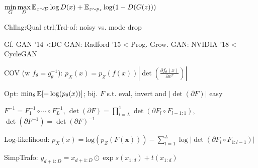 $\min\limits_G\max\limits_D \mathbb{E}_{x\sim\mathcal{D}}\log D(x)+\mathbb{E}_{z\sim p_z}\log(1-D(G(z)))$

Chllng:Qual ctrl;Trd-of: noisy vs. mode drop

Gf. GAN '14 <DC GAN: Radford '15 < Prog.-Grow. GAN: NVIDIA '18 < CycleGAN

COV (w $f_{\theta}=g_{\theta}^{-1}$): $p_X(x)=p_Z(f(x))|\det (\frac{\partial f_{\theta}(x)}{\partial x^T})|$

Opt: $\min_{\theta}\mathbb{E}[-\log(p_{\theta}(x))]$;
 bij. $F$ s.t. eval, invert and $|\det(\partial F)|$ easy 

$F^{-1}=F_1^{-1}\circ\cdots\circ F_L^{-1}$, $\det (\partial F)=\prod^1_{l=L}\det(\partial F_l\circ F_{l-1:1})$, $\det(\partial F^{-1})=\det(\partial F)^{-1}$

Log-likelihood: $ p_X(x) = \text{log}(p_Z(F(\mathbf{x})))  - \sum^L_{l=1}\log|\det(\partial F_l\circ F_{1:l-1})|$

SimpTrafo: $y_{d+1  :D}=x_{d+1:D}\odot\exp s(x_{1:d})+t(x_{1:d})$


